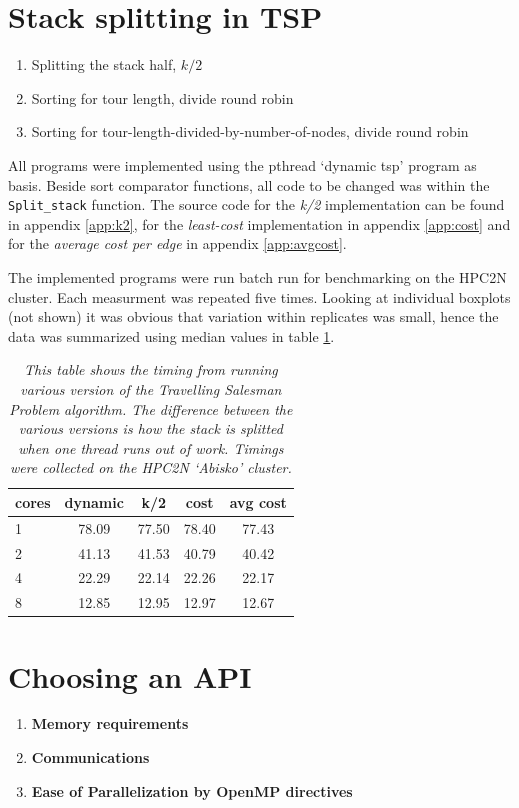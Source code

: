 \documentclass[a4paper,11pt,twoside]{article}
\begin{document}
\section{Stack splitting in TSP}
\begin{enumerate}[label={\alph*)}]
\item Splitting the stack half, $k/2$
\item Sorting for tour length, divide round robin
\item Sorting for tour-length-divided-by-number-of-nodes, divide round robin
\end{enumerate}

All programs were implemented using the pthread `dynamic tsp' program as basis. Beside sort comparator functions, all code to be changed was within the \verb+Split_stack+ function. The source code for the \textit{k/2} implementation can be found in appendix \ref{app:k2}, for the \textit{least-cost} implementation in appendix \ref{app:cost} and for the \textit{average cost per edge} in appendix \ref{app:avgcost}.  

The implemented programs were run batch run for benchmarking on the HPC2N cluster. Each measurment was repeated five times. Looking at individual boxplots (not shown) it was obvious that variation within replicates was small, hence the data was summarized using median values in table \ref{tab:tsp}.

\begin{table}[]
\centering
\caption{\textit{This table shows the timing from running various version of the Travelling Salesman Problem algorithm. The difference between the various versions is how the stack is splitted when one thread runs out of work. Timings were collected on the HPC2N `Abisko' cluster.}}
\label{tab:tsp}
\begin{tabular}{l|cccc}
cores & dynamic & k/2   & cost  & avg cost \\ \hline
1     & 78.09   & 77.50 & 78.40 & 77.43    \\
2     & 41.13   & 41.53 & 40.79 & 40.42    \\
4     & 22.29   & 22.14 & 22.26 & 22.17    \\
8     & 12.85   & 12.95 & 12.97 & 12.67   
\end{tabular}
\end{table}


\section{Choosing an API}
\begin{enumerate}[label={\alph*)}]
\item \textbf{Memory requirements}
\item \textbf{Communications}
\item \textbf{Ease of Parallelization by OpenMP directives}
\end{enumerate}



\end{document}
